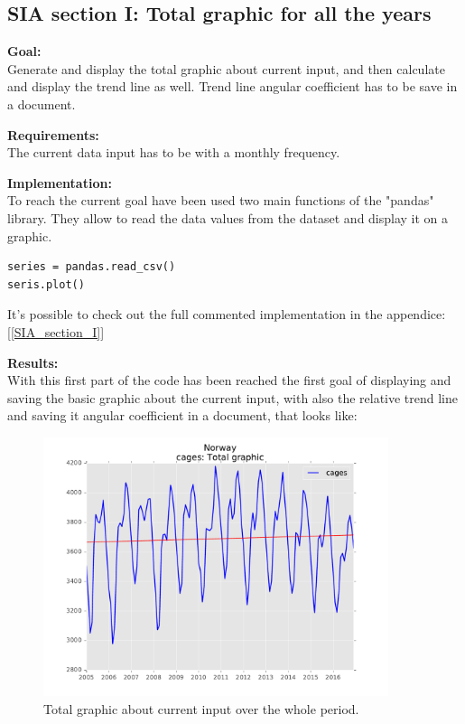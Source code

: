 \newpage

\subsection{SIA section I: Total graphic for all the years}
\textbf{Goal:}\\
Generate and display the total graphic about current input, and then calculate and display the trend line as well. Trend line angular coefficient has to be save in a document.

\textbf{Requirements:}\\
The current data input has to be with a monthly frequency. 

\textbf{Implementation:}\\
To reach the current goal have been used two main functions of the "pandas" library. They allow to read the data values from the dataset and display it on a graphic.
\begin{lstlisting}
series = pandas.read_csv()
seris.plot()
\end{lstlisting}

It's possible to check out the full commented implementation in the appendice: [\ref{SIA_section_I}]

\textbf{Results:} \\
With this first part of the code has been reached the first goal of displaying and saving the basic graphic about the current input, with also the relative trend line and saving it angular coefficient in a document, that looks like:

\begin{figure}[H]
\includegraphics[width=0.9\textwidth]{Files/Cages_Total.pdf}
\caption{Total graphic about current input over the whole period.}
\end{figure}



